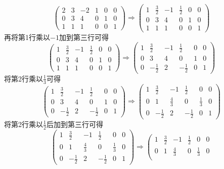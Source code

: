 $$
\left( \begin{array}{ccc|ccc}
	2 & 3 & -2 & 1 & 0 & 0\\
	0 & 3 & 4 & 0 & 1 & 0\\
	1 & 1 & 1 & 0 & 0 & 1
\end{array} \right)\Longrightarrow  \left( \begin{array}{ccc|ccc}
	1 & \frac{3}{2} & -1 & \frac{1}{2} & 0 & 0\\
	0 & 3 & 4 & 0 & 1 & 0\\
	1 & 1 & 1 & 0 & 0 & 1
\end{array} \right)
$$再将第1行乘以$-1$加到第三行可得$$\left( \begin{array}{ccc|ccc}
	1 & \frac{3}{2} & -1 & \frac{1}{2} & 0 & 0\\
	0 & 3 & 4 & 0 & 1 & 0\\
	1 & 1 & 1 & 0 & 0 & 1
\end{array} \right)\Longrightarrow  \left( \begin{array}{ccc|ccc}
	1 & \frac{3}{2} & -1 & \frac{1}{2} & 0 & 0\\
	0 & 3 & 4 & 0 & 1 & 0\\
	0 & -\frac{1}{2} & 2 & -\frac{1}{2} & 0 & 1
\end{array} \right)$$将第2行乘以$\displaystyle \frac{1}{3}$可得$$\left( \begin{array}{ccc|ccc}
	1 & \frac{3}{2} & -1 & \frac{1}{2} & 0 & 0\\
	0 & 3 & 4 & 0 & 1 & 0\\
	0 & -\frac{1}{2} & 2 & -\frac{1}{2} & 0 & 1
\end{array} \right)\Longrightarrow  \left( \begin{array}{ccc|ccc}
	1 & \frac{3}{2} & -1 & \frac{1}{2} & 0 & 0\\
	0 & 1 & \frac{4}{3} & 0 & \frac{1}{3} & 0\\
	0 & -\frac{1}{2} & 2 & -\frac{1}{2} & 0 & 1
\end{array} \right)$$将第2行乘以$\frac{1}{2}$后加到第三行可得$$\left( \begin{array}{ccc|ccc}
	1 & \frac{3}{2} & -1 & \frac{1}{2} & 0 & 0\\
	0 & 1 & \frac{4}{3} & 0 & \frac{1}{3} & 0\\
	0 & -\frac{1}{2} & 2 & -\frac{1}{2} & 0 & 1
\end{array} \right)\Longrightarrow  \left( \begin{array}{ccc|ccc}
	1 & \frac{3}{2} & -1 & \frac{1}{2} & 0 & 0\\
	0 & 1 & \frac{4}{3} & 0 & \frac{1}{3} & 0\\

\end{array}$$
